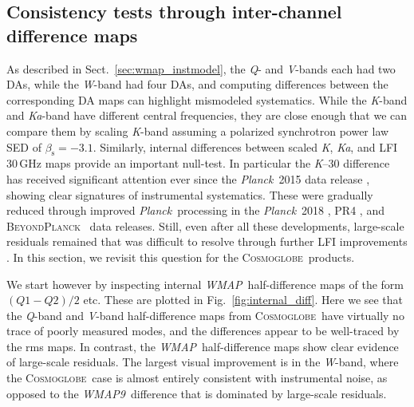 \documentclass[twocolumn]{../../common/aa}
\def\WMAP{\emph{WMAP}}
\def\WMAPnine{\emph{WMAP9}}
\def\Planck{\emph{Planck}}
\newcommand{\bp}{\textsc{BeyondPlanck}}
\newcommand{\cosmoglobe}{\textsc{Cosmoglobe}}
\newcommand{\K}[0]{\textit K}
\newcommand{\Ka}[0]{\textit{Ka}}
\newcommand{\Q}[0]{\textit Q}
\newcommand{\V}[0]{\textit V}
\newcommand{\W}[0]{\textit W}
\begin{document}







\subsection{Consistency tests through inter-channel difference maps}
\label{sec:internal_consistency}

As described in Sect.~\ref{sec:wmap_instmodel}, the \Q- and \V-bands each had two DAs, while the \W-band had four DAs, and computing differences between the corresponding DA maps can highlight mismodeled systematics. While the \K-band and \Ka-band have different central frequencies, they are close enough that we can compare them by scaling \K-band assuming a polarized synchrotron power law SED of $\beta_\mathrm s=-3.1$. Similarly, internal differences between scaled \K, \Ka, and LFI 30\,GHz maps provide an important null-test. In particular the \K--30 difference has received significant attention ever since the \Planck\ 2015 data release \citep{planck2014-a01}, showing clear signatures of instrumental systematics. These were gradually reduced through improved \Planck\ processing in the \Planck\ 2018 \citep{planck2016-l02}, PR4 \citep{npipe}, and \bp\ \citep{bp01} data releases. Still, even after all these developments, large-scale residuals remained that was difficult to resolve through further LFI improvements \citep{bp07}. In this section, we revisit this question for the \cosmoglobe\ products.

We start however by inspecting internal \WMAP\ half-difference maps of the form $(Q1-Q2)/2$ etc. These are plotted in Fig.~\ref{fig:internal_diff}. Here we see that the \Q-band and \V-band half-difference maps from \cosmoglobe\ have virtually no trace of poorly measured modes, and the differences appear to be well-traced by the rms maps. In contrast, the \WMAP\ half-difference maps show clear evidence of large-scale residuals. The largest visual improvement is in the \W-band, where the \cosmoglobe\ case is almost entirely consistent with instrumental noise, as opposed to the \WMAPnine\ difference that is dominated by large-scale residuals.  
\end{document}
